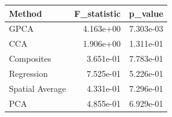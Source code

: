 \begin{tabular}{lrr}
\toprule
Method & F_statistic & p_value \\
\midrule
GPCA & 4.163e+00 & 7.303e-03 \\
CCA & 1.906e+00 & 1.311e-01 \\
Composites & 3.651e-01 & 7.783e-01 \\
Regression & 7.525e-01 & 5.226e-01 \\
Spatial Average & 4.331e-01 & 7.296e-01 \\
PCA & 4.855e-01 & 6.929e-01 \\
\bottomrule
\end{tabular}
